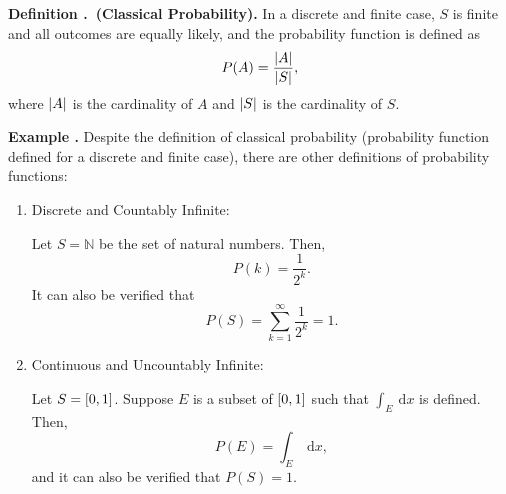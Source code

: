 \documentclass[12pt, a4paper]{article}
\newcounter{index}[subsection]
\newenvironment*{df}[1]{\par\noindent\textbf{Definition \thesubsection.\stepcounter{index}\theindex\ (#1).}}{\par}
\newenvironment*{eg}{\begin{framed}\par\noindent\textbf{Example \thesubsection.\stepcounter{index}\theindex}}{\par\end{framed}}
\def\N{\mathbb{N}}
\def\d{\mathrm{d}}
\def\dsst{\displaystyle}
\begin{document}
\begin{df}{Classical Probability}
	In a discrete and finite case, $S$ is finite and all outcomes are equally likely, and the probability function is defined as \[P(A)=\dfrac{\qty|A|}{\qty|S|},\] where $\qty|A|$ is the cardinality of $A$ and $\qty|S|$ is the cardinality of $S$.	
\end{df}
\begin{eg}
	Despite the definition of classical probability (probability function defined for a discrete and finite case), there are other definitions of probability functions: 
	\begin{enumerate}
		\item Discrete and Countably Infinite: \par Let $S=\N$ be the set of natural numbers. Then, \[P(k)=\dfrac{1}{2^k}.\] It can also be verified that \[P(S)=\sum_{k=1}^\infty\dfrac{1}{2^k}=1.\]
		\item Continuous and Uncountably Infinite: \par Let $S=\qty[0,1]$. Suppose $E$ is a subset of $\qty[0,1]$ such that $\dsst\int_E\ \d x$ is defined. Then, \[P(E)=\int_E\ \d x,\] and it can also be verified that $P(S)=1$.
	\end{enumerate}	
\end{eg}

\newpage
\end{document}
